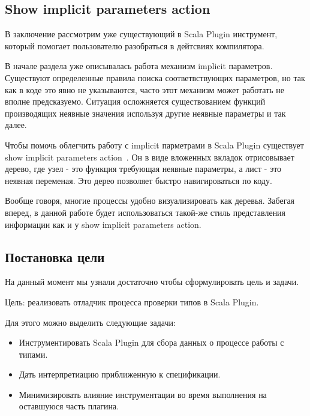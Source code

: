 
\subsection{Show implicit parameters action}
\label{sec:showImplicit}

В заключение рассмотрим уже существующий в Scala Plugin инструмент, который
помогает пользователю разобраться в дейтсвиях компилятора.

В начале раздела уже описывалась работа механизм implicit параметров.
Существуют определенные правила поиска соответвствующих параметров,
но так как в коде это явно не указываются, часто этот механизм
может работать не вполне предсказуемо.
Ситуация осложняется существованием функций производящих неявные значения
используя другие неявные параметры и так далее.

Чтобы помочь облегчить работу с implicit парметрами в Scala Plugin существует
show implicit parameters action~\cite{show_implicit}.
Он в виде вложенных вкладок отрисовывает дерево, где узел - это функция требующая
неявные параметры, а лист - это неявная переменая.
Это дерео позволяет быстро навигироваться по коду.

Вообще говоря, многие процессы удобно визуализировать как деревья.
Забегая вперед, в данной работе будет использоваться такой-же стиль
представления информации как и у show implicit parameters action.

\subsection{Постановка цели}

На данный момент мы узнали достаточно чтобы сформулировать цель и задачи.

Цель:
реализовать отладчик процесса проверки типов в Scala Plugin.

Для этого можно выделить следующие задачи:
\begin{itemize}
  \item Инструментировать Scala Plugin для сбора данных о процессе работы с типами.
  \item Дать интерпретиацию приближенную к спецификации.
  \item Минимизировать влияние инструментации во время выполнения на оставшуюся
  часть плагина.
\end{itemize}

